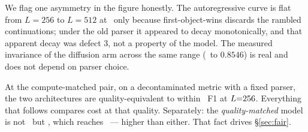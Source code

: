 We flag one asymmetry in the figure honestly. The autoregressive curve is flat
from $L{=}256$ to $L{=}512$ at \arThreeBFnine\ only because first-object-wins
discards the rambled continuations; under the old parser it appeared to decay
monotonically, and that apparent decay was defect 3, not a property of the
model. The measured invariance of the diffusion arm across the same range
(\dgNineF\ to $0.8546$) is real and does not depend on parser choice.

\begin{takeaway}
At the compute-matched pair, on a decontaminated metric with a fixed parser,
the two architectures are quality-equivalent to within \qualityGap\ F1 at
$L{=}256$. Everything that follows compares cost at that quality.
Separately: the \emph{quality-matched} model is not \ARthree\ but \ARoneb,
which reaches \arOneFiveFnine\ --- higher than either. That fact drives
\S\ref{sec:fair}.
\end{takeaway}
